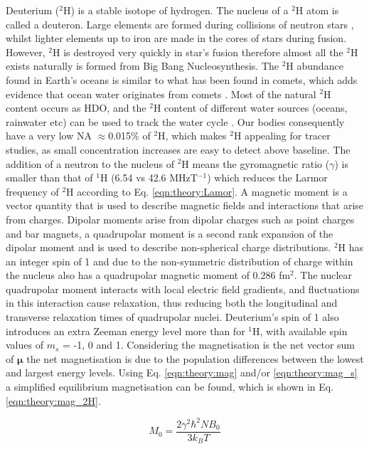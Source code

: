 Deuterium ($^2$H) is a stable isotope of hydrogen. The nucleus of a $^2$H atom is called a deuteron. Large elements are formed during collisions of neutron stars \cite{Watson2019IdentificationStars}, whilst lighter elements up to iron are made in the cores of stars during fusion. However, $^2$H is destroyed very quickly in star's fusion \cite{Patrignani2016ReviewPhysics} therefore almost all the $^2$H exists naturally is formed from Big Bang Nucleosynthesis. The $^2$H abundance found in Earth's oceans is similar to what has been found in comets, which adds evidence that ocean water originates from comets \cite{Hersant2001APlanets}. Most of the natural $^2$H content occurs as \ac{HDO}, and the $^2$H content of different water sources (oceans, rainwater etc) can be used to track the water cycle \cite{Bowen2019IsotopesApplications}. Our bodies consequently have a very low \ac{NA} $\approx$0.015\% of $^2$H, which makes $^2$H appealing for tracer studies, as small concentration increases are easy to detect above baseline. The addition of a neutron to the nucleus of $^2$H means the gyromagnetic ratio ($\gamma$) is smaller than that of $^1$H (6.54 vs 42.6 MHzT$^{-1}$) which reduces the Larmor frequency of $^2$H according to Eq. \ref{eqn:theory:Lamor}. A magnetic moment is a vector quantity that is used to describe magnetic fields and interactions that arise from charges. Dipolar moments arise from dipolar charges such as point charges and bar magnets, a quadrupolar moment is a second rank expansion of the dipolar moment and is used to describe non-spherical charge distributions. $^2$H has an integer spin of 1 and due to the non-symmetric distribution of charge within the nucleus also has a quadrupolar magnetic moment of 0.286 fm$^2$. The nuclear quadrupolar moment interacts with local electric field gradients, and fluctuations in this interaction cause relaxation, thus reducing both the longitudinal and transverse relaxation times of quadrupolar nuclei. Deuterium's spin of 1 also introduces an extra Zeeman energy level more than for $^1$H, with available spin values of $m_s$ = -1, 0 and 1. Considering the magnetisation is the net vector sum of $\mathbf{\mu}$ the net magnetisation is due to the population differences between the lowest and largest energy levels. Using Eq. \ref{eqn:theory:mag} and/or \ref{eqn:theory:mag_s} a simplified equilibrium magnetisation can be found, which is shown in Eq. \ref{eqn:theory:mag_2H}.

\begin{equation}
    M_0 = \frac{2\gamma^2 \hbar^2 N B_0}{3k_BT}
    \label{eqn:theory:mag_2H}
\end{equation}


